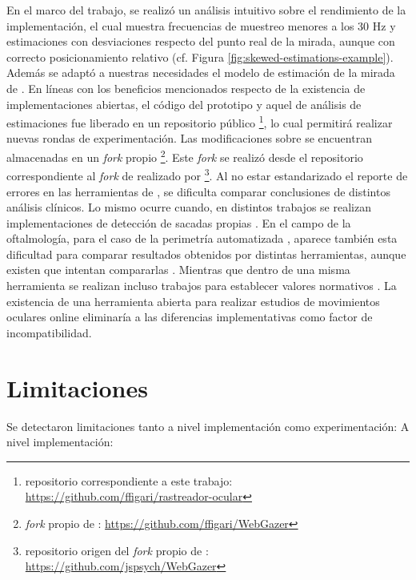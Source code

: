 En el marco del trabajo, se realizó un análisis intuitivo sobre el rendimiento
de la implementación, el cual muestra frecuencias de muestreo menores a los 30
Hz y estimaciones con desviaciones respecto del punto real de la mirada, aunque
con correcto posicionamiento relativo (cf. Figura
\ref{fig:skewed-estimations-example}).
Además se adaptó a nuestras necesidades el modelo de estimación de la mirada de
\webgazer.
En líneas con los beneficios mencionados respecto de la existencia de
implementaciones abiertas, el código del prototipo y aquel de análisis de
estimaciones fue liberado en un repositorio público \footnote{repositorio
correspondiente a este trabajo:
\url{https://github.com/ffigari/rastreador-ocular}}, lo cual permitirá
realizar nuevas rondas de experimentación.
Las modificaciones sobre \webgazer se encuentran almacenadas en un
\textit{fork} propio \footnote{\textit{fork} propio de \webgazer:
\url{https://github.com/ffigari/WebGazer}}.
Este \textit{fork} se realizó desde el repositorio correspondiente al
\textit{fork} de \webgazer realizado por \jspsych \footnote{repositorio origen
del \textit{fork} propio de \webgazer:
\url{https://github.com/jspsych/WebGazer}}.
Al no estar estandarizado el reporte de errores en las herramientas de
\eyetracking \cite{zandi_2021_pupilext}, se dificulta comparar conclusiones de
distintos análisis clínicos.
Lo mismo ocurre cuando, en distintos trabajos se realizan implementaciones de
detección de sacadas propias \cite{salvucci_2000_identifying_fixations}.
En el campo de la oftalmología, para el caso de la perimetría automatizada
\cite{pubmed_1996_automated_perimetry}, aparece también esta dificultad para
comparar resultados obtenidos por distintas herramientas, aunque existen que
intentan compararlas \cite{landers_2007_automated_perimeters_comparison}.
Mientras que dentro de una misma herramienta se realizan incluso trabajos para
establecer valores normativos \cite{brenton_1986_humphrey_normal_visual_field}.
La existencia de una herramienta abierta para realizar estudios de movimientos
oculares online eliminaría a las diferencias implementativas como factor de
incompatibilidad.

\section{Limitaciones}

Se detectaron limitaciones tanto a nivel implementación como experimentación:
A nivel implementación: 

